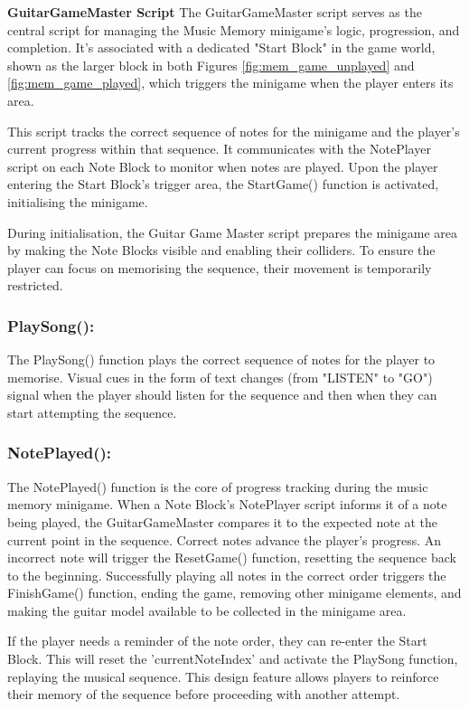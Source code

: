 \documentclass{l4proj}
\begin{document}
\textbf{GuitarGameMaster Script} \newline
The GuitarGameMaster script serves as the central script for managing the Music Memory minigame's logic, progression, and completion. It's associated with a dedicated "Start Block" in the game world, shown as the larger block in both Figures \ref{fig:mem_game_unplayed} and  \ref{fig:mem_game_played}, which triggers the minigame when the player enters its area.

This script tracks the correct sequence of notes for the minigame and the player's current progress within that sequence. It communicates with the NotePlayer script on each Note Block to monitor when notes are played. Upon the player entering the Start Block's trigger area, the StartGame() function is activated, initialising the minigame.

During initialisation, the Guitar Game Master script prepares the minigame area by making the Note Blocks visible and enabling their colliders. To ensure the player can focus on memorising the sequence, their movement is temporarily restricted. 

\subsubsection{PlaySong():} The PlaySong() function plays the correct sequence of notes for the player to memorise. Visual cues in the form of text changes (from "LISTEN" to "GO") signal when the player should listen for the sequence and then when they can start attempting the sequence.

\subsubsection{NotePlayed():} The NotePlayed() function is the core of progress tracking during the music memory minigame. When a Note Block's NotePlayer script informs it of a note being played, the GuitarGameMaster compares it to the expected note at the current point in the sequence. Correct notes advance the player's progress. An incorrect note will trigger the ResetGame() function, resetting the sequence back to the beginning. Successfully playing all notes in the correct order triggers the FinishGame() function, ending the game, removing other minigame elements, and making the guitar model available to be collected in the minigame area.

If the player needs a reminder of the note order, they can re-enter the Start Block. This will reset the 'currentNoteIndex' and activate the PlaySong function, replaying the musical sequence. This design feature allows players to reinforce their memory of the sequence before proceeding with another attempt.
\end{document}
